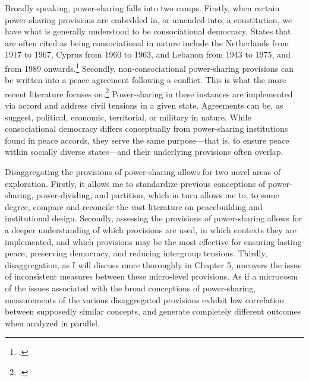 \documentclass[12pt]{article}
\begin{document}
Broadly speaking, power-sharing falls into two camps. Firstly, when certain power-sharing provisions are embedded in, or amended into, a constitution, we have what is generally understood to be consociational democracy. States that are often cited as being consociational in nature include the Netherlands from 1917 to 1967, Cyprus from 1960 to 1963, and Lebanon from 1943 to 1975, and from 1989 onwards.\footcite{andeweg_consociational_2000, lijphart_consociational_1977, picard_political_2000} Secondly, non-consociational power-sharing provisions can be written into a peace agreement following a conflict. This is what the more recent literature focuses on.\footcite{strom_inclusion_2017, graham_safeguarding_2017, jarstad_words_2008, mukherjee_why_2006} Power-sharing in these instances are implemented via accord and address civil tensions in a given state. Agreements can be, as  \cite{hartzell_institutionalizing_2003, hartzell_crafting_2007} suggest, political, economic, territorial, or military in nature. While consociational democracy differs conceptually from power-sharing institutions found in peace accords, they serve the same purpose---that is, to ensure peace within socially diverse states---and their underlying provisions often overlap.

Disaggregating the provisions of power-sharing allows for two novel areas of exploration. Firstly, it allows me to standardize previous conceptions of power-sharing, power-dividing, and partition, which in turn allows me to, to some degree, compare and reconcile the vast literature on peacebuilding and institutional design. Secondly, assessing the provisions of power-sharing allows for a deeper understanding of which provisions are used, in which contexts they are implemented, and which provisions may be the most effective for ensuring lasting peace, preserving democracy, and reducing intergroup tensions. Thirdly, disaggregation, as I will discuss more thoroughly in Chapter 5, uncovers the issue of inconsistent measures between these micro-level provisions. As if a microcosm of the issues associated with the broad conceptions of power-sharing, measurements of the various disaggregated provisions exhibit low correlation between supposedly similar concepts, and generate completely different outcomes when analyzed in parallel. 
\end{document}
